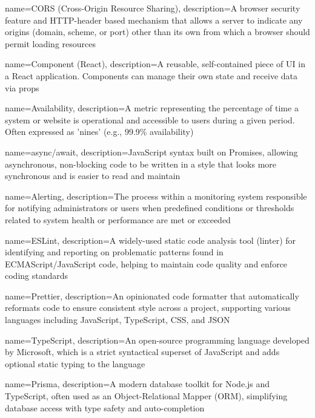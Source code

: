 {
    name=CORS (Cross-Origin Resource Sharing),
    description={A browser security feature and HTTP-header based mechanism that allows a server to indicate any origins (domain, scheme, or port) other than its own from which a browser should permit loading resources}
}

{
    name={Component (React)},
    description={A reusable, self-contained piece of UI in a React application. Components can manage their own state and receive data via props}
}

{
    name=Availability,
    description={A metric representing the percentage of time a system or website is operational and accessible to users during a given period. Often expressed as 'nines' (e.g., 99.9\% availability)}
}

{
    name=async/await,
    description={JavaScript syntax built on Promises, allowing asynchronous, non-blocking code to be written in a style that looks more synchronous and is easier to read and maintain}
}

{
    name=Alerting,
    description={The process within a monitoring system responsible for notifying administrators or users when predefined conditions or thresholds related to system health or performance are met or exceeded}
}

{
    name=ESLint,
    description={A widely-used static code analysis tool (linter) for identifying and reporting on problematic patterns found in ECMAScript/JavaScript code, helping to maintain code quality and enforce coding standards}
}




{
    name=Prettier,
    description={An opinionated code formatter that automatically reformats code to ensure consistent style across a project, supporting various languages including JavaScript, TypeScript, CSS, and JSON}
}

{
    name=TypeScript,
    description={An open-source programming language developed by Microsoft, which is a strict syntactical superset of JavaScript and adds optional static typing to the language}
}

{
    name=Prisma,
    description={A modern database toolkit for Node.js and TypeScript, often used as an Object-Relational Mapper (ORM), simplifying database access with type safety and auto-completion}
}

